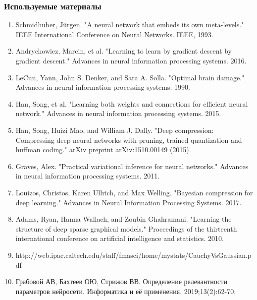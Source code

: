 \documentclass[10pt,pdf,utf8,russian,aspectratio=169]{beamer}
\begin{document}
\begin{frame}
\frametitle{Используемые материалы}
\footnotesize
\begin{enumerate}
\item Schmidhuber, Jürgen. "A neural network that embeds its own meta-levels." IEEE International Conference on Neural Networks. IEEE, 1993.
\item Andrychowicz, Marcin, et al. "Learning to learn by gradient descent by gradient descent." Advances in neural information processing systems. 2016.
\item LeCun, Yann, John S. Denker, and Sara A. Solla. "Optimal brain damage." Advances in neural information processing systems. 1990.
\item Han, Song, et al. "Learning both weights and connections for efficient neural network." Advances in neural information processing systems. 2015.
\item Han, Song, Huizi Mao, and William J. Dally. "Deep compression: Compressing deep neural networks with pruning, trained quantization and huffman coding." arXiv preprint arXiv:1510.00149 (2015).
\item Graves, Alex. "Practical variational inference for neural networks." Advances in neural information processing systems. 2011.
\item Louizos, Christos, Karen Ullrich, and Max Welling. "Bayesian compression for deep learning." Advances in Neural Information Processing Systems. 2017.
\item Adams, Ryan, Hanna Wallach, and Zoubin Ghahramani. "Learning the structure of deep sparse graphical models." Proceedings of the thirteenth international conference on artificial intelligence and statistics. 2010.
\item http://web.ipac.caltech.edu/staff/fmasci/home/mystats/CauchyVsGaussian.pdf
\item Грабовой АВ, Бахтеев ОЮ, Стрижов ВВ. Определение релевантности параметров нейросети. Информатика и её применения. 2019;13(2):62-70.

\end{enumerate}
\end{frame}
\end{document}
